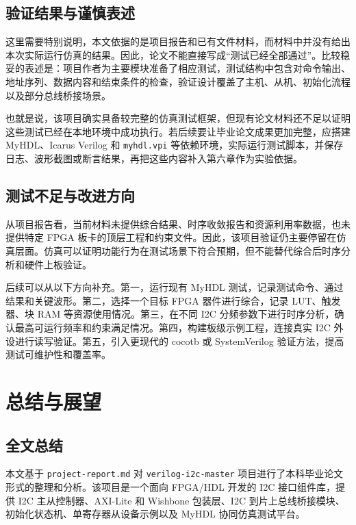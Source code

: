\documentclass[12pt,a4paper]{article}
\numberwithin{equation}{section}
\begin{document}
\subsection{验证结果与谨慎表述}

这里需要特别说明，本文依据的是项目报告和已有文件材料，而材料中并没有给出本次实际运行仿真的结果。因此，论文不能直接写成“测试已经全部通过”。比较稳妥的表述是：项目作者为主要模块准备了相应测试，测试结构中包含对命令输出、地址序列、数据内容和结束条件的检查，验证设计覆盖了主机、从机、初始化流程以及部分总线桥接场景。

也就是说，该项目确实具备较完整的仿真测试框架，但现有论文材料还不足以证明这些测试已经在本地环境中成功执行。若后续要让毕业论文成果更加完整，应搭建 MyHDL、Icarus Verilog 和 \texttt{myhdl.vpi} 等依赖环境，实际运行测试脚本，并保存日志、波形截图或断言结果，再把这些内容补入第六章作为实验依据。

\subsection{测试不足与改进方向}

从项目报告看，当前材料未提供综合结果、时序收敛报告和资源利用率数据，也未提供特定 FPGA 板卡的顶层工程和约束文件。因此，该项目验证仍主要停留在仿真层面。仿真可以证明功能行为在测试场景下符合预期，但不能替代综合后时序分析和硬件上板验证。

后续可以从以下方向补充。第一，运行现有 MyHDL 测试，记录测试命令、通过结果和关键波形。第二，选择一个目标 FPGA 器件进行综合，记录 LUT、触发器、块 RAM 等资源使用情况。第三，在不同 I2C 分频参数下进行时序分析，确认最高可运行频率和约束满足情况。第四，构建板级示例工程，连接真实 I2C 外设进行读写验证。第五，引入更现代的 cocotb 或 SystemVerilog 验证方法，提高测试可维护性和覆盖率。

\clearpage
\section{总结与展望}

\subsection{全文总结}

本文基于 \texttt{project-report.md} 对 \texttt{verilog-i2c-master} 项目进行了本科毕业论文形式的整理和分析。该项目是一个面向 FPGA/HDL 开发的 I2C 接口组件库，提供 I2C 主从控制器、AXI-Lite 和 Wishbone 包装层、I2C 到片上总线桥接模块、初始化状态机、单寄存器从设备示例以及 MyHDL 协同仿真测试平台。
\end{document}
